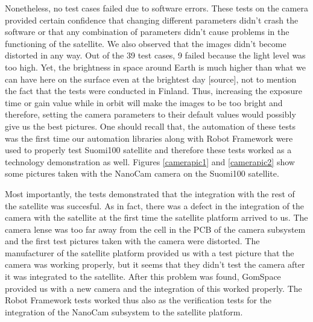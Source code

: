 \documentclass[english,12pt,a4paper,pdftex,elec,utf8]{aaltothesis}
\begin{document}
Nonetheless, no test cases failed due to software errors. These tests on the camera provided certain confidence that changing different parameters didn't crash the software or that any combination of parameters didn't cause problems in the functioning of the satellite. We also observed that the images didn't become distorted in any way. Out of the 39 test cases, 9 failed because the light level was too high. Yet, the brightness in space around Earth is much higher than what we can have here on the surface even at the brightest day [source], not to mention the fact that the tests were conducted in Finland. Thus, increasing the exposure time or gain value while in orbit will make the images to be too bright and therefore, setting the camera parameters to their default values would possibly give us the best pictures. One should recall that, the automation of these tests was the first time our automation libraries along with Robot Framework were used to properly test Suomi100 satellite and therefore these tests worked as a technology demonstration as well. Figures \ref{camerapic1} and \ref{camerapic2} show some pictures taken with the NanoCam camera on the Suomi100 satellite. \par
Most importantly, the tests demonstrated that the integration with the rest of the satellite was succesful. As in fact, there was a defect in the integration of the camera with the satellite at the first time the satellite platform arrived to us. The camera lense was too far away from the cell in the PCB of the camera subsystem and the first test pictures taken with the camera were distorted. The manufacturer of the satellite platform provided us with a test picture that the camera was working properly, but it seems that they didn't test the camera after it was integrated to the satellite. After this problem was found, GomSpace provided us with a new camera and the integration of this worked properly. The Robot Framework tests worked thus also as the verification tests for the integration of the NanoCam subsystem to the satellite platform.\par 
\end{document}

